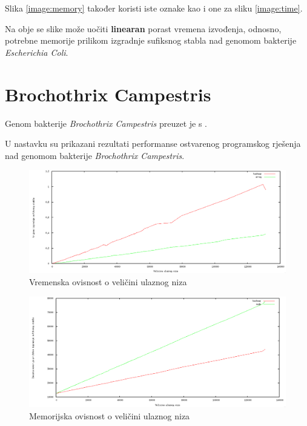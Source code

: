 \documentclass[times, utf8, seminar, numeric]{fer}
\begin{document}
Slika \ref{image:memory} također koristi iste oznake kao i one za sliku \ref{image:time}. 

Na obje se slike može uočiti \textbf{linearan} porast vremena izvođenja, odnosno, potrebne memorije prilikom izgradnje sufiksnog stabla nad genomom bakterije \textit{Escherichia Coli}.


\section{Brochothrix Campestris}
	Genom bakterije \textit{Brochothrix Campestris} preuzet je s \cite{klamidija}. 
	
	U nastavku su prikazani rezultati performanse ostvarenog programskog rješenja nad genomom bakterije \textit{Brochothrix Campestris}.

\begin{figure}[h!]	
	\centering
	\includegraphics[width=1\textwidth]{media/time_2.png}
	\caption{Vremenska ovisnost o veličini ulaznog niza}
	\label{image:time1}
\end{figure}

\begin{figure}[h!]	
	\centering
	\includegraphics[width=1\textwidth]{media/memory_2.png}
	\caption{Memorijska ovisnost o veličini ulaznog niza}
	\label{image:memory1}
\end{figure}

\pagebreak
\end{document}
